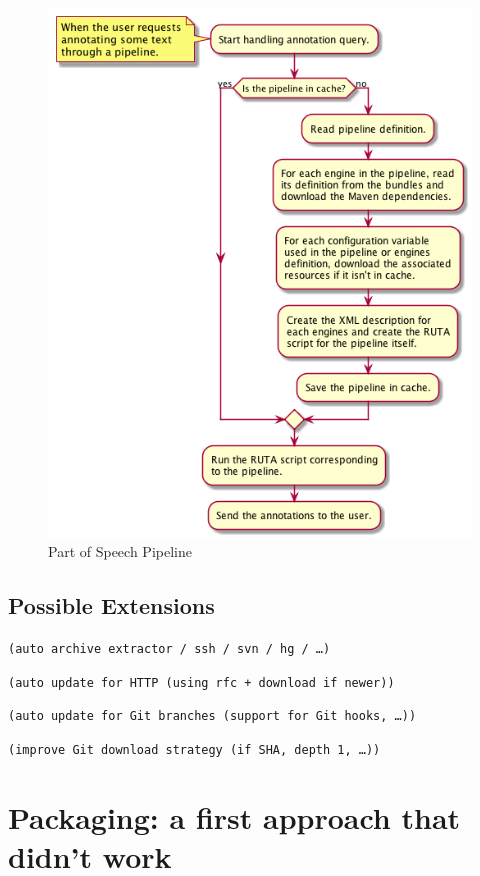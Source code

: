 \documentclass{article}
\newcommand{\TODO}[1]{\texttt{\textcolor{YellowOrange}{(#1)}}} %
\begin{document}
\begin{figure}
    \centering
    \includegraphics[width=\linewidth]{res/sherlok_load_pipeline.png}
    \caption{Part of Speech Pipeline}
    \label{fig:sherlok_load_pipeline}
\end{figure}

\subsection{Possible Extensions}

\TODO{auto archive extractor / ssh / svn / hg / \dots}

\TODO{auto update for HTTP (using rfc + download if newer)}

\TODO{auto update for Git branches (support for Git hooks, \dots)}

\TODO{improve Git download strategy (if SHA, depth 1, \dots)}

\section{Packaging: a first approach that didn't work}
\label{sec:packaging1}
\end{document}
